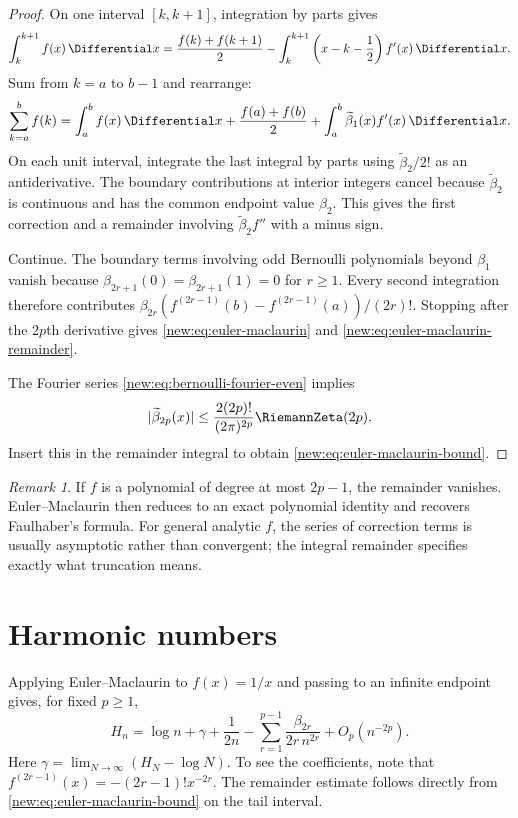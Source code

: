 \documentclass[11pt,a4paper,oneside,openany]{book}
\theoremstyle{definition}
\theoremstyle{remark}
\newtheorem{remark}[theorem]{Remark}
\begin{document}
\begin{proof}
On one interval $[k,k+1]$, integration by parts gives
\[
 \int_k^{k+1}f(x)\,\Differential x
 =\frac{f(k)+f(k+1)}2
 -\int_k^{k+1}\left(x-k-\frac12\right)f'(x)\,\Differential x.
\]
Sum from $k=a$ to $b-1$ and rearrange:
\begin{equation}
 \sum_{k=a}^bf(k)
 =\int_a^bf(x)\,\Differential x+\frac{f(a)+f(b)}2
 +\int_a^b\widetilde\beta_1(x)f'(x)\,\Differential x.
 \label{new:eq:em-start}
\end{equation}
On each unit interval, integrate the last integral by parts using
$\widetilde\beta_2/2!$ as an antiderivative.  The boundary contributions at
interior integers cancel because $\widetilde\beta_2$ is continuous and has the
common endpoint value $\beta_2$.  This gives the first correction and a
remainder involving $\widetilde\beta_2f''$ with a minus sign.

Continue.  The boundary terms involving odd Bernoulli polynomials beyond
$\beta_1$ vanish because $\beta_{2r+1}(0)=\beta_{2r+1}(1)=0$ for $r\ge1$.
Every second integration therefore contributes
$\beta_{2r}(f^{(2r-1)}(b)-f^{(2r-1)}(a))/(2r)!$.  Stopping after the
$2p$th derivative gives \eqref{new:eq:euler-maclaurin} and
\eqref{new:eq:euler-maclaurin-remainder}.

The Fourier series \eqref{new:eq:bernoulli-fourier-even} implies
\[
 |\widetilde\beta_{2p}(x)|
 \le\frac{2(2p)!}{(2\pi)^{2p}}\RiemannZeta(2p).
\]
Insert this in the remainder integral to obtain
\eqref{new:eq:euler-maclaurin-bound}.
\end{proof}

\begin{remark}
If $f$ is a polynomial of degree at most $2p-1$, the remainder vanishes.
Euler--Maclaurin then reduces to an exact polynomial identity and recovers
Faulhaber's formula.  For general analytic $f$, the series of correction terms
is usually asymptotic rather than convergent; the integral remainder specifies
exactly what truncation means.
\end{remark}

\section{Harmonic numbers}

Applying Euler--Maclaurin to $f(x)=1/x$ and passing to an infinite endpoint
gives, for fixed $p\ge1$,
\begin{equation}
 H_n=\log n+\gamma+\frac1{2n}
 -\sum_{r=1}^{p-1}\frac{\beta_{2r}}{2r\,n^{2r}}
 +O_p(n^{-2p}).
 \label{new:eq:harmonic-em}
\end{equation}
Here $\gamma=\lim_{N\to\infty}(H_N-\log N)$.  To see the coefficients,
note that
$f^{(2r-1)}(x)=-(2r-1)!x^{-2r}$.  The remainder estimate follows directly
from \eqref{new:eq:euler-maclaurin-bound} on the tail interval.
\end{document}
